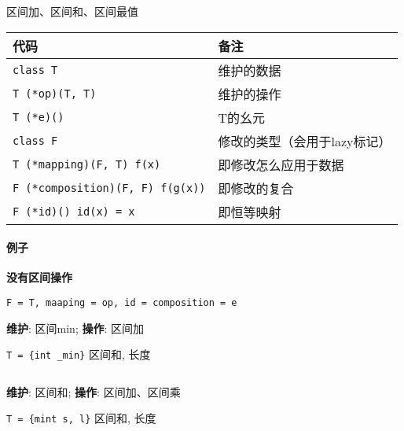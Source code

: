 区间加、区间和、区间最值

\begin{tabular}{ll}
    \hline
    代码                                    & 备注               \\
    \hline
    \verb|class T|                        & 维护的数据            \\
    \verb|T (*op)(T, T)|                  & 维护的操作            \\
    \verb|T (*e)()|                       & T的幺元             \\
    \verb|class F|                        & 修改的类型（会用于lazy标记） \\
    \verb|T (*mapping)(F, T) f(x)|        & 即修改怎么应用于数据       \\
    \verb|F (*composition)(F, F) f(g(x))| & 即修改的复合           \\
    \verb|F (*id)() id(x) = x|            & 即恒等映射            \\
    \hline
\end{tabular}

\paragraph{例子}

\textbf{没有区间操作}

\verb|F = T, maaping = op, id = composition = e|

\textbf{维护}: 区间min; \textbf{操作}: 区间加

\verb|T = {int _min}| 区间和, 长度

\inputminted{cpp}{src/src/segtree_eg1.txt}

\textbf{维护}: 区间和; \textbf{操作}: 区间加、区间乘

\verb|T = {mint s, l}| 区间和, 长度

\inputminted{cpp}{src/src/segtree_eg2.txt}
